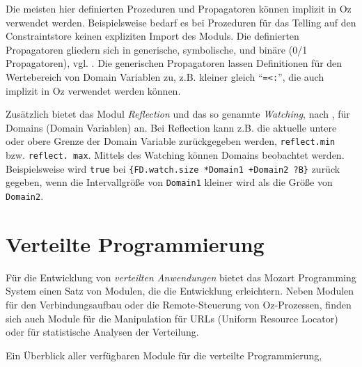 Die meisten hier definierten Prozeduren und Propagatoren können implizit in Oz
verwendet werden. Beispielsweise bedarf es bei Prozeduren für das Telling auf den
Constraintstore keinen expliziten Import des Moduls. Die definierten
Propagatoren gliedern sich in generische, symbolische, und binäre (0/1
Propagatoren), vgl. \cite[System Modules, Part II, Chapter 5
]{url:mozart-documentation}. Die generischen
Propagatoren lassen Definitionen für den Wertebereich von Domain Variablen zu,
z.B. kleiner gleich "`\texttt{=<:}"', die auch implizit in Oz verwendet werden
können. 

Zusätzlich bietet das Modul \textsl{Reflection} und das so genannte
\textsl{Watching}, nach \cite[System Modules, Part II, Chapter
5.5]{url:mozart-documentation}, für Domains (Domain
Variablen) an. Bei Reflection kann z.B. die aktuelle untere oder obere Grenze
der Domain Variable zurückgegeben werden, \texttt{reflect.min} bzw.
\texttt{reflect. max}. Mittels des Watching können Domains beobachtet werden.
Beispielsweise wird \texttt{true} bei \texttt{\{FD.watch.size *Domain1 +Domain2
?B\}} zurück gegeben, wenn die Intervallgröße von \texttt{Domain1} kleiner
wird als die Größe von \texttt{Domain2}.

\section{Verteilte Programmierung}

Für die Entwicklung von \textsl{verteilten Anwendungen} bietet das Mozart
Programming System einen Satz von Modulen, die die Entwicklung erleichtern.
Neben Modulen für den Verbindungsaufbau oder die Remote-Steuerung von
Oz-Prozessen, finden sich auch Module für die Manipulation für URLs (Uniform
Resource Locator) oder für statistische Analysen der Verteilung.

Ein Überblick aller verfügbaren Module für die verteilte Programmierung, 


